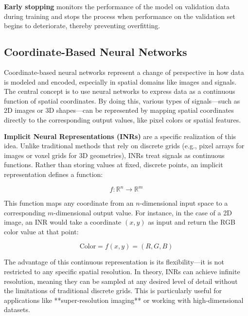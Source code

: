 \textbf{Early stopping} monitors the performance of the model on validation data during training and stops the process when performance on the validation set begins to deteriorate, thereby preventing overfitting.



\subsection{Coordinate-Based Neural Networks}

Coordinate-based neural networks represent a change of perspective in how data is modeled and encoded, especially in spatial domains like images and signals. The central concept is to use neural networks to express data as a continuous function of spatial coordinates. By doing this, various types of signals—such as 2D images or 3D shapes—can be represented by mapping spatial coordinates directly to the corresponding output values, like pixel colors or spatial features.

\textbf{Implicit Neural Representations (INRs)} are a specific realization of this idea. Unlike traditional methods that rely on discrete grids (e.g., pixel arrays for images or voxel grids for 3D geometries), INRs treat signals as continuous functions. Rather than storing values at fixed, discrete points, an implicit representation defines a function:

\[
f: \mathbb{R}^n \to \mathbb{R}^m
\]

This function maps any coordinate from an \(n\)-dimensional input space to a corresponding \(m\)-dimensional output value. For instance, in the case of a 2D image, an INR would take a coordinate \((x, y)\) as input and return the RGB color value at that point:

\[
\text{Color} = f(x, y) = (R, G, B)
\]

The advantage of this continuous representation is its flexibility—it is not restricted to any specific spatial resolution. In theory, INRs can achieve infinite resolution, meaning they can be sampled at any desired level of detail without the limitations of traditional discrete grids. This is particularly useful for applications like **super-resolution imaging** or working with high-dimensional datasets.

